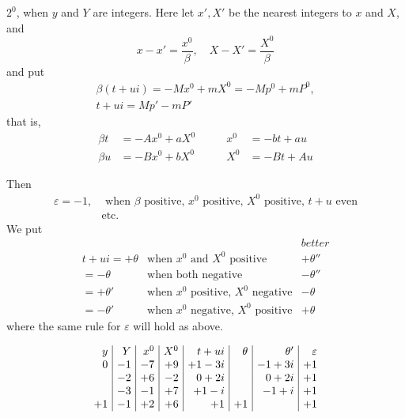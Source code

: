 $2^0$, when $y$ and $Y$ are integers. Here let $x',X'$ be the nearest integers to $x$ and $X$, and
\[
x-x'=\frac{x^0}{\beta},\quad X-X'=\frac{X^0}{\beta}
\]
and put
\[
\begin{gathered}
\beta(t+ui)=-Mx^0+mX^0=-Mp^0+mP^0,\\
t+ui=Mp'-mP'
\end{gathered}
\]
that is,
\[
\begin{alignedat}{2}
\beta t&=-Ax^0+aX^0\qquad&x^0&=-bt+au\\
\beta u&=-Bx^0+bX^0&X^0&=-Bt+Au
\end{alignedat}
\]

Then
\[
\begin{aligned}
\varepsilon=-1,&\text{ when }\beta\text{ positive, }x^0\text{ positive, }X^0\text{ positive, }t+u\text{ even}\\
&\text{etc.}
\end{aligned}
\]
We put
\[
\begin{array}{rll}
&&\textit{better}\\
t+ui=+\theta&\text{when }x^0\text{ and }X^0\text{ positive}&+\theta''\\
=-\theta&\text{when both negative}&-\theta''\\
=+\theta'&\text{when }x^0\text{ positive, }X^0\text{ negative}&-\theta\\
=-\theta'&\text{when }x^0\text{ negative, }X^0\text{ positive}&+\theta
\end{array}
\]
where the same rule for $\varepsilon$ will hold as above.

\[
\setlength{\arraycolsep}{4pt}
\begin{array}{r|r|r|r|r|r|r|r}
y&Y&x^0&X^0&t+ui&\theta&\theta'&\varepsilon\\
0&-1&-7&+9&+1-3i&&-1+3i&+1\\
&-2&+6&-2&0+2i&&0+2i&+1\\
&-3&-1&+7&+1-i&&-1+i&+1\\
+1&-1&+2&+6&+1&+1&&+1
\end{array}
\]

